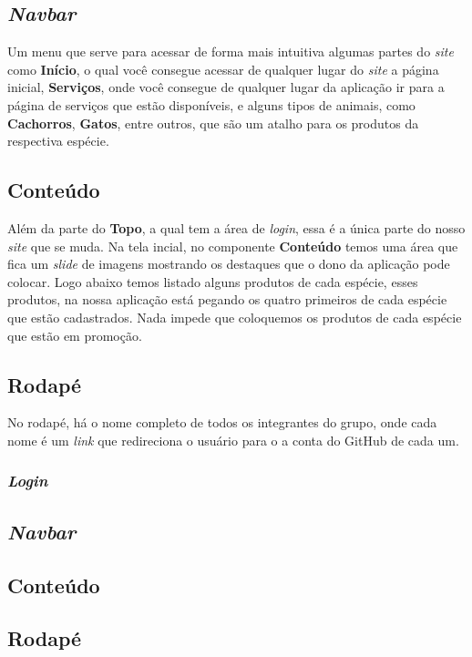 \subsection{\emph{Navbar}}
Um menu que serve para acessar de forma mais intuitiva algumas partes do
\emph{site} como \textbf{Início}, o qual você consegue acessar de qualquer lugar
do \emph{site} a página inicial, \textbf{Serviços}, onde você consegue de
qualquer lugar da aplicação ir para a página de serviços que estão disponíveis,
e alguns tipos de animais, como \textbf{Cachorros}, \textbf{Gatos}, entre
outros, que são um atalho para os produtos da respectiva espécie.

\subsection{Conteúdo}
Além da parte do \textbf{Topo}, a qual tem a área de \emph{login}, essa é a
única parte do nosso \emph{site} que se muda. Na tela incial, no componente
\textbf{Conteúdo} temos uma área que fica um \emph{slide} de imagens mostrando
os destaques que o dono da aplicação pode colocar. Logo abaixo temos listado
alguns produtos de cada espécie, esses produtos, na nossa aplicação está pegando
os quatro primeiros de cada espécie que estão cadastrados. Nada impede que
coloquemos os produtos de cada espécie que estão em promoção.

\subsection{Rodapé}
No rodapé, há o nome completo de todos os integrantes do grupo, onde cada nome é
um \emph{link} que redireciona o usuário para o a conta do GitHub de cada um.

\subsubsection{\emph{Login}}
\subsection{\emph{Navbar}}
\subsection{Conteúdo}
\subsection{Rodapé}

